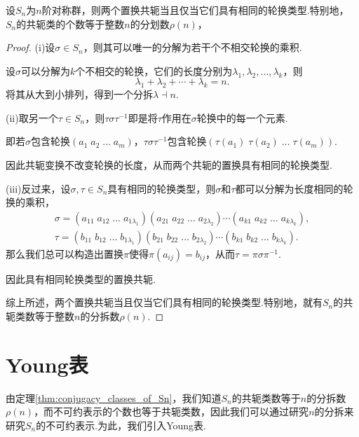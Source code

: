 \begin{theorem}[$S_n$的共轭类数]{\label{thm:conjugacy_classes_of_Sn}}
    设$S_n$为$n$阶对称群，则两个置换共轭当且仅当它们具有相同的轮换类型.特别地，$S_n$的共轭类的个数等于整数$n$的分划数$\rho(n)$，
\end{theorem}
\begin{proof}
    (i)设$\sigma\in S_n$，则其可以唯一的分解为若干个不相交轮换的乘积.\par
    设$\sigma$可以分解为$k$个不相交的轮换，它们的长度分别为$\lambda_1,\lambda_2,\ldots,\lambda_k$，则
    \begin{equation*}
        \lambda_1+\lambda_2+\cdots+\lambda_k=n.
    \end{equation*}
    将其从大到小排列，得到一个分拆$\lambda\dashv n$.\par
    (ii)取另一个$\tau\in S_n$，则$\tau\sigma\tau^{-1}$即是将$\tau$作用在$\sigma$轮换中的每一个元素.\par
    即若$\sigma$包含轮换$(a_1\; a_2\;\ldots\; a_m)$，$\tau\sigma\tau^{-1}$包含轮换$(\tau(a_1)\;\tau(a_2)\;\ldots\;\tau(a_m))$.\par
    因此共轭变换不改变轮换的长度，从而两个共轭的置换具有相同的轮换类型.\par
    (iii)反过来，设$\sigma,\tau\in S_n$具有相同的轮换类型，则$\sigma$和$\tau$都可以分解为长度相同的轮换的乘积，
    \begin{gather*}
        \sigma=(a_{11}\; a_{12}\;\ldots\; a_{1\lambda_1})(a_{21}\; a_{22}\;\ldots\; a_{2\lambda_2})\cdots(a_{k1}\; a_{k2}\;\ldots\; a_{k\lambda_k}),\\
        \tau=(b_{11}\; b_{12}\;\ldots\; b_{1\lambda_1})(b_{21}\; b_{22}\;\ldots\; b_{2\lambda_2})\cdots(b_{k1}\; b_{k2}\;\ldots\; b_{k\lambda_k}).
    \end{gather*}
    那么我们总可以构造出置换$\pi$使得$\pi(a_{ij})=b_{ij}$，从而$\tau=\pi\sigma\pi^{-1}$.\par
    因此具有相同轮换类型的置换共轭.\par
    综上所述，两个置换共轭当且仅当它们具有相同的轮换类型.特别地，就有$S_n$的共轭类数等于整数$n$的分拆数$\rho(n)$.
\end{proof}


\section{Young表}

由定理\ref{thm:conjugacy_classes_of_Sn}，我们知道$S_n$的共轭类数等于$n$的分拆数$\rho(n)$，而不可约表示的个数也等于共轭类数，因此我们可以通过研究$n$的分拆来研究$S_n$的不可约表示.为此，我们引入Young表.

